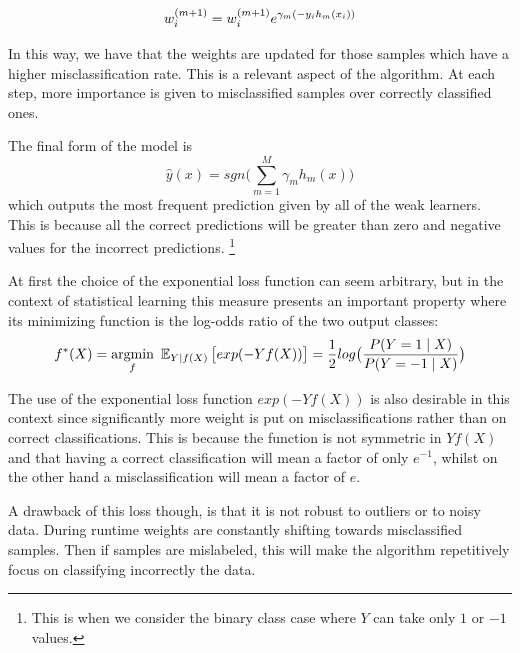 \begin{equation}
w_i^{(m+1)} =   w_i^{(m+1)} e^{\gamma_m(-y_i h_m(x_i))} \\
\end{equation}

In this way, we have that the weights are updated for those samples which have a higher misclassification rate. This is a relevant aspect of the algorithm. At each step, more importance is given to misclassified samples over correctly classified ones.



The final form of the model is
\begin{equation}
  \hat{y}(x) = sgn\big(  \sum_{m=1}^{M} \gamma_m h_m(x) \big)
\end{equation}
   which outputs the most frequent prediction given by all of the weak learners. This is because all the correct predictions will be greater than zero and negative values for the incorrect predictions. \footnote{This is when we consider the binary class case where $Y$ can take only $1$ or $-1$ values.}

At first the choice of the exponential loss function can seem arbitrary, but in the context of statistical learning this measure presents an important property where its minimizing function is the log-odds ratio of the two output classes:
\begin{equation}
f^*(X) = \underset{f}{\mathrm{argmin}} \  \operatorname{\mathbb{E}}_{Y | f(X)}\big[ exp(-Yf(X))  \big] = \frac{1}{2}
log\big( \frac{ P(Y=1 \mid X) }{ P(Y=-1 \mid X) }  \big)
\end{equation}


The use of the exponential loss function $exp(-Yf(X))$ is also desirable in this context since significantly more weight is put on misclassifications rather than on correct classifications. This is because the function is not symmetric in $Yf(X)$ and that having a correct classification will mean a factor of only $e^{-1}$, whilst on the other hand a misclassification will mean a factor of $e$.

A drawback of this loss though, is that it is not robust to outliers or to noisy data. During runtime weights are constantly shifting towards misclassified samples. Then if samples are mislabeled, this will make the algorithm repetitively focus on classifying incorrectly the data.



